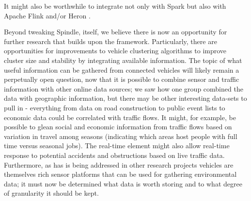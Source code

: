 \documentclass{thesis}
\begin{document}
    It might also be worthwhile to integrate not only with Spark but also with Apache Flink \cite{flink}
    and/or Heron \cite{heron}.

    Beyond tweaking Spindle, itself, we believe there is now an opportunity for further research that builds
    upon the framework. Particularly, there are opportunities for improvements to vehicle clustering algorithms
    to improve cluster size and stability by integrating available information. The topic of what
    useful information can be gathered from connected vehicles will likely remain a perpetually open question,
    now that it is possible to combine sensor and traffic information with other online data sources; we saw
    how one group combined the data with geographic information, but there may be other interesting data-sets
    to pull in - everything from data on road construction to public event lists to economic data could be
    correlated with traffic flows. It might, for example, be possible to glean social and economic information
    from traffic flows based on variation in travel among seasons (indicating which areas host people with full
    time versus seasonal jobs). The real-time element might also allow real-time response to potential accidents
    and obstructions based on live traffic data. Furthermore, as has is being addressed in other research projects %
    vehicles are themselves rich sensor platforms that can be used for gathering environmental data; it must
    now be determined what data is worth storing and to what degree of granularity it should be kept.

\begin{singlespace}


\end{singlespace}
\end{document}
